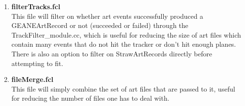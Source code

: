 \begin{enumerate}
      \item{\bf{filterTracks.fcl}} \\
      This file will filter on whether art events successfully produced a GEANEArtRecord or not (succeeded or failed) through the TrackFilter\_module.cc, which is useful for reducing the size of art files which contain many events that do not hit the tracker or don't hit enough planes. There is also an option to filter on StrawArtRecords directly before attempting to fit.

      \item{\bf{fileMerge.fcl}} \\
      This file will simply combine the set of art files that are passed to it, useful for reducing the number of files one has to deal with.

    \end{enumerate}
